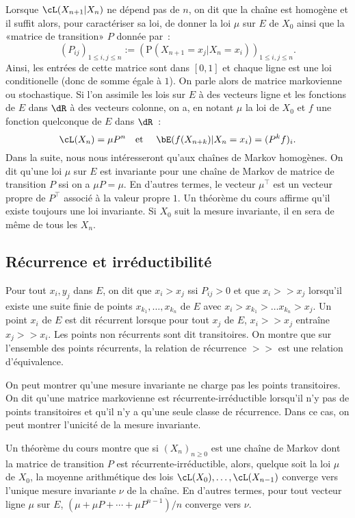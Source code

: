 Lorsque $\cL(X_{n+1} \vert X_n)$ ne dépend pas de $n$, on dit que la
chaîne est homogène et il suffit alors, pour caractériser sa loi, de donner la
loi $\mu$ sur $E$ de $X_0$ ainsi que la «matrice de transition» $P$ donnée
par~:
$$
(P_{ij})_{1\leq i,j\leq n} 
:=\left(\mathrm{P}(X_{n+1}=x_j\vert X_n=x_i)\right)_{1\leq i,j\leq n}.
$$
Ainsi, les entrées de cette matrice sont dans $[0,1]$ et chaque ligne est
une loi conditionelle (donc de somme égale à $1$). On parle alors de matrice
markovienne ou stochastique. Si l'on assimile les lois sur $E$ à des vecteurs
ligne et les fonctions de $E$ dans $\dR$ à des vecteurs colonne, on a, en
notant $\mu$ la loi de $X_0$ et $f$ une fonction quelconque de $E$ dans
$\dR$~:
$$
\cL(X_n) = \mu P^n \text{\quad et \quad}
\bE(f(X_{n+k})\vert X_n=x_i)=(P^k f)_i.
$$
Dans la suite, nous nous intéresseront qu'aux chaînes de Markov homogènes.
On dit qu'une loi $\mu$ sur $E$ est invariante pour une chaîne de Markov de
matrice de transition $P$ ssi on a $\mu P = \mu$. En d'autres termes, le
vecteur $\mu^\top$ est un vecteur propre de $P^\top$ associé à la valeur
propre $1$. Un théorème du cours affirme qu'il existe toujours une loi
invariante. Si $X_0$ suit la mesure invariante, il en sera de même de tous les
$X_n$. 

%
\subsection{Récurrence et irréductibilité}
%

Pour tout $x_i,y_j$ dans $E$, on dit que $x_i > x_j$ ssi $P_{ij}>0$ et que
$x_i >> x_j$ lorsqu'il existe une suite finie de points
$x_{k_1},\ldots,x_{k_n}$ de $E$ avec $x_i > x_{k_1} > \ldots x_{k_n} > x_j$.
Un point $x_i$ de $E$ est dit récurrent lorsque pour tout $x_j$ de $E$, $x_i
>> x_j$ entraîne $x_j >> x_i$. Les points non récurrents sont dit
transitoires. On montre que sur l'ensemble des points récurrents, la relation
de récurrence $>>$ est une relation d'équivalence. 

On peut montrer qu'une mesure invariante ne charge pas les points transitoires.
On dit qu'une matrice markovienne est récurrente-irréductible lorsqu'il n'y
pas de points transitoires et qu'il n'y a qu'une seule classe de récurrence.
Dans ce cas, on peut montrer l'unicité de la mesure invariante.

Un théorème du cours montre que si $(X_n)_{n\geq 0}$ est une chaîne de Markov
dont la matrice de transition $P$ est récurrente-irréductible, alors, quelque
soit la loi $\mu$ de $X_0$, la moyenne arithmétique des lois
$\cL(X_0),\ldots,\cL(X_{n-1})$ converge vers l'unique mesure
invariante $\nu$ de la chaîne. En d'autres termes, pour tout vecteur ligne
$\mu$ sur $E$, $(\mu+\mu P + \cdots + \mu P^{n-1})/n$ converge vers $\nu$.


